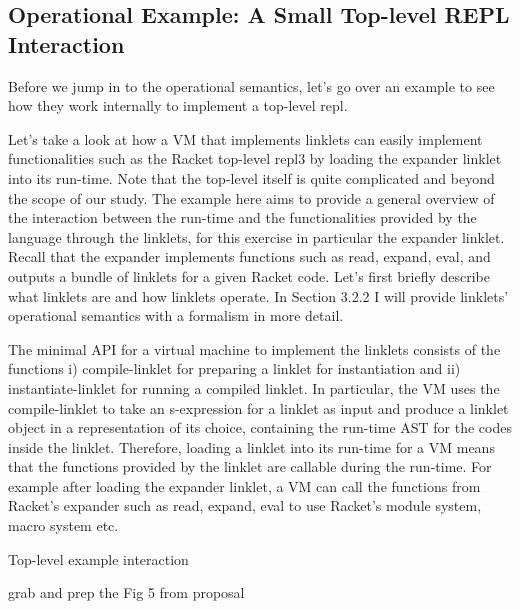 


		\subsection{Operational Example: A Small Top-level REPL Interaction}

		\begin{paragraph-here}
			Before we jump in to the operational semantics, let's go over an example to see how they work internally to implement a top-level repl.

			Let’s take a look at how a VM that implements linklets can easily implement functionalities such as the Racket top-level repl3 by loading the expander linklet into its run-time. Note that the top-level itself is quite complicated and beyond the scope of our study. The example here aims to provide a general overview of the interaction between the run-time and the functionalities provided by the language through the linklets, for this exercise in particular the expander linklet. Recall that the expander implements functions such as read, expand, eval, and outputs a bundle of linklets for a given Racket code. Let’s first briefly describe what linklets are and how linklets operate. In Section 3.2.2 I will provide linklets’ operational semantics with a formalism in more detail.
		\end{paragraph-here}


		\begin{paragraph-here}
			The minimal API for a virtual machine to implement the linklets consists of the functions i) compile-linklet for preparing a linklet for instantiation and ii) instantiate-linklet for running a compiled linklet. In particular, the VM uses the compile-linklet to take an s-expression for a linklet as input and produce a linklet object in a representation of its choice, containing the run-time AST for the codes inside the linklet. Therefore, loading a linklet into its run-time for a VM means that the functions provided by the linklet are callable during the run-time. For example after loading the expander linklet, a VM can call the functions from Racket’s expander such as read, expand, eval to use Racket’s module system, macro system etc.
		\end{paragraph-here}

		\begin{figure-here}
			Top-level example interaction

			\begin{todo}
				grab and prep the Fig 5 from proposal
			\end{todo}
		\end{figure-here}


